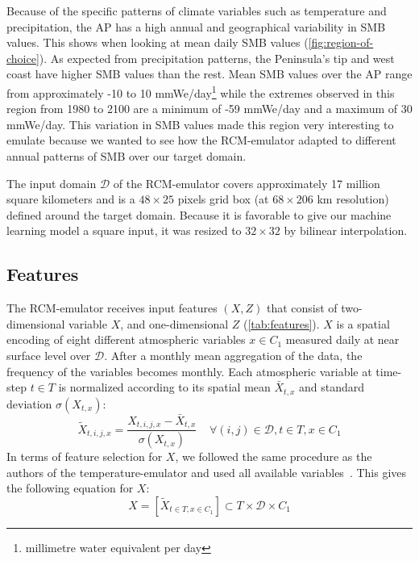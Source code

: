 \documentclass[a4paper,11pt,oneside]{report}
\begin{document}
 Because of the specific patterns of climate variables such as temperature and precipitation, the AP has a high annual and geographical variability in SMB values. This shows when looking at mean daily SMB values (\autoref{fig:region-of-choice}). As expected from precipitation patterns, the Peninsula's tip and west coast have higher SMB values than the rest. Mean SMB values over the AP range from approximately -10 to 10 \si{mmWe/day}\footnote{millimetre water equivalent per day} while the extremes observed in this region from 1980 to 2100 are a minimum of -59 \si{mmWe/day} and a maximum of 30 \si{mmWe/day}. This variation in SMB values made this region very interesting to emulate because we wanted to see how the RCM-emulator adapted to different annual patterns of SMB over our target domain. 
 
 The input domain $\mathcal{D}$ of the RCM-emulator covers approximately 17 million square kilometers and is a $48\times25$ pixels grid box (at $68 \times 206$ \si{km} resolution) defined around the target domain. Because it is favorable to give our machine learning model a square input, it was resized to $32\times 32$ by bilinear interpolation. 



\subsection{Features}\label{subsec:features}

The RCM-emulator receives input features $(X, Z)$ that consist of two-dimensional variable $X$, and one-dimensional $Z$ (\autoref{tab:features}). $X$ is a spatial encoding of eight different atmospheric variables $x\in C_1$ measured daily at near surface level over $\mathcal{D}$. After a monthly mean aggregation of the data, the frequency of the variables becomes monthly. Each atmospheric variable at time-step $t\in T$ is normalized according to its spatial mean $\bar{X}_{t,x}$ and standard deviation $\sigma(X_{t,x})$:
\begin{equation}\label{eq:normalisation-X}
            \tilde{X}_{t,i,j,x} = \frac{X_{t,i,j,x}-\bar{X}_{t,x}}{\sigma(X_{t,x})} \;\;\;\; \forall (i,j) \in \mathcal{D}, t\in T, x\in C_1
\end{equation}
In terms of feature selection for $X$, we followed the same procedure as the authors of the temperature-emulator and used all available variables~\cite{Doury}. This gives the following equation for $X$:
\begin{equation}\label{eq:X}
    X = \left[\tilde{X}_{t\in T, x\in C_1} \right] \subset T \times \mathcal{D} \times C_1
\end{equation}
\end{document}
